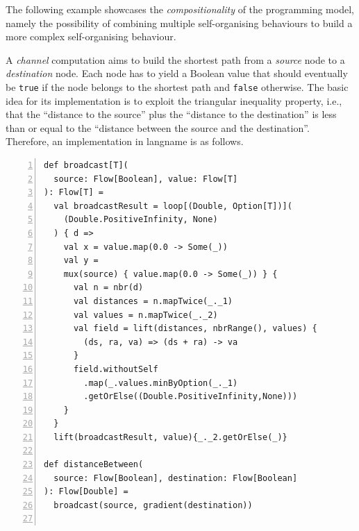 The following example showcases the \emph{compositionality} of the programming model,
 namely the possibility
 of combining multiple self-organising behaviours
 to build a more complex self-organising behaviour.

\begin{example}\label{acsos2023-frp:ex:channel}
%
A \emph{channel} computation aims to build the shortest path
from a \emph{source} node to a \emph{destination} node.
%
Each node has to yield a Boolean value that should eventually be \lstinline|true| if the node belongs to the shortest path
and \lstinline|false| otherwise.
%
The basic idea for its implementation is to exploit the triangular inequality property, i.e., that the ``distance to the source'' plus the ``distance to the destination'' is less than or equal to the ``distance between the source and the destination''.
%
Therefore, an implementation in \ac{langname} is as follows.
%
\begin{minipage}{\columnwidth}
\begin{lstlisting}[escapechar=\%,numbers=left,xleftmargin=0.3cm,numbersep=4pt]
def broadcast[T](
  source: Flow[Boolean], value: Flow[T]
): Flow[T] =
  val broadcastResult = loop[(Double, Option[T])](
    (Double.PositiveInfinity, None)
  ) { d =>
    val x = value.map(0.0 -> Some(_))
    val y =
    mux(source) { value.map(0.0 -> Some(_)) } {
      val n = nbr(d)
      val distances = n.mapTwice(_._1)
      val values = n.mapTwice(_._2)
      val field = lift(distances, nbrRange(), values) {
        (ds, ra, va) => (ds + ra) -> va
      }
      field.withoutSelf
        .map(_.values.minByOption(_._1)
        .getOrElse((Double.PositiveInfinity,None)))
    }
  }
  lift(broadcastResult, value){_._2.getOrElse(_)}

def distanceBetween(
  source: Flow[Boolean], destination: Flow[Boolean]
): Flow[Double] =
  broadcast(source, gradient(destination))


\end{lstlisting}
\end{minipage}
\end{example}
